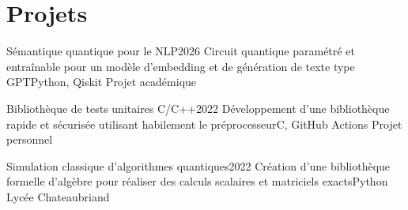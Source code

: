 \section{Projets}
\resumeSubHeadingListStart
    \resumeProjectHeading
    {Sémantique quantique pour le NLP}{2026}
    {Circuit quantique paramétré et entraînable pour un modèle d'embedding et de génération de texte type GPT}{Python, Qiskit}
    {}
    {Projet académique}
    \vspace{-7pt}
    \resumeItemListStart
    \resumeItemListEnd

    \resumeProjectHeading
    {Bibliothèque de tests unitaires C/C++}{2022}
    {Développement d'une bibliothèque rapide et sécurisée utilisant habilement le préprocesseur}{C, GitHub Actions}
    {}
    {Projet personnel}
    \vspace{-7pt}
    \resumeItemListStart
    \resumeItemListEnd

    \resumeProjectHeading
    {Simulation classique d'algorithmes quantiques}{2022}
    {Création d'une bibliothèque formelle d'algèbre pour réaliser des calculs scalaires et matriciels exacts}{Python}
    {}
    {Lycée Chateaubriand}
    \vspace{-7pt}
    \resumeItemListStart
    \resumeItemListEnd

\resumeSubHeadingListEnd
